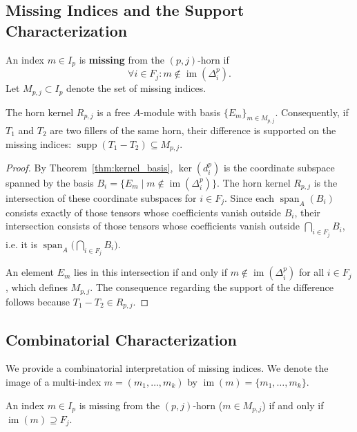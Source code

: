 \subsection{Missing Indices and the Support Characterization}

\begin{definition}\label{def:missing_index}
An index $m\in I_p$ is \textbf{missing} from the $(p,j)$-horn if
\[
\forall i \in F_j: m \notin \operatorname{im}(\Delta_i^p).
\]
Let $M_{p,j} \subset I_p$ denote the set of missing indices.
\end{definition}

\begin{theorem}\label{thm:support_characterization}
The horn kernel $R_{p,j}$ is a free $A$-module with basis $\{E_m\}_{m \in M_{p,j}}$. 
Consequently, if $T_1$ and $T_2$ are two fillers of the same horn, their difference 
is supported on the missing indices: $\operatorname{supp}(T_1-T_2) \subseteq M_{p,j}$.
\end{theorem}
\begin{proof}
By Theorem~\ref{thm:kernel_basis}, $\ker(d_i^p)$ is the coordinate subspace spanned by the basis
$B_i = \{E_m \mid m \notin \operatorname{im}(\Delta_i^p)\}$.
The horn kernel $R_{p,j}$ is the intersection of these coordinate subspaces for $i\in F_j$.
Since each $\operatorname{span}_A(B_i)$ consists exactly of those tensors whose coefficients vanish outside $B_i$, 
their intersection consists of those tensors whose coefficients vanish outside $\bigcap_{i\in F_j} B_i$, i.e. it is 
$\operatorname{span}_A\!\bigl(\bigcap_{i\in F_j} B_i\bigr)$.



An element $E_m$ lies in this intersection if and only if $m \notin \operatorname{im}(\Delta_i^p)$ for all $i\in F_j$, which defines $M_{p,j}$.
The consequence regarding the support of the difference follows because $T_1-T_2 \in R_{p,j}$.
\end{proof}

\subsection{Combinatorial Characterization}

We provide a combinatorial interpretation of missing indices. We denote the image of a multi-index $m=(m_1, \dots, m_k)$ by $\operatorname{im}(m) = \{m_1, \dots, m_k\}$.

\begin{proposition}\label{prop:missing_indices}
An index $m\in I_p$ is missing from the $(p,j)$-horn ($m \in M_{p,j}$) if and only if $\operatorname{im}(m) \supseteq F_j$.
\end{proposition}


